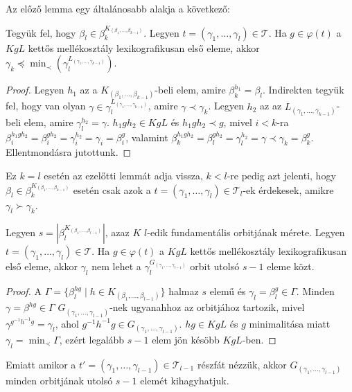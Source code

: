 Az előző lemma egy általánosabb alakja a következő:
\begin{lemma}
\label{thm:permbtcrit3}
Tegyük fel, hogy $\beta_l \in \beta_k^{K_{(\beta_1,\dots,\beta_{k-1})}}$.
Legyen $t = (\gamma_1, \dots, \gamma_l) \in \mathcal{T}$.
Ha $g \in \varphi(t)$ a $KgL$ kettős mellékosztály lexikografikusan első eleme, akkor $\gamma_k \preceq \min_{\prec}(\gamma_l^{L_{(\gamma_1,\dots,\gamma_{k-1})}})$.
\end{lemma}
\begin{proof}
Legyen $h_1$ az a $K_{(\beta_1,\dots,\beta_{k-1})}$-beli elem, amire $\beta_k^{h_1} = \beta_l$.
Indirekten tegyük fel, hogy van olyan $\gamma \in \gamma_l^{L_{(\gamma_1,\dots,\gamma_{k-1})}}$, amire $\gamma \prec \gamma_k$.
Legyen $h_2$ az az $L_{(\gamma_1,\dots,\gamma_{k-1})}$-beli elem, amire $\gamma_l^{h_2} = \gamma$.
$h_1gh_2 \in KgL$ és $h_1gh_2 \prec g$, mivel $i < k$-ra $\beta_i^{h_1gh_2} = \beta_i^{gh_2} = \gamma_i^{h_2} = \gamma_i = \beta_i^g$,
valamint $\beta_k^{h_1gh_2} = \beta_l^{gh_2} = \gamma_l^{h_2} = \gamma \prec \gamma_k = \beta_k^g$.
Ellentmondásra jutottunk.
\end{proof}
Ez $k=l$ esetén az ezelőtti lemmát adja vissza, $k < l$-re pedig azt jelenti, hogy $\beta_l \in \beta_k^{K_{(\beta_1,\dots,\beta_{k-1})}}$ esetén csak azok a $t = (\gamma_1, \dots, \gamma_l) \in \mathcal{T}_l$-ek
érdekesek, amikre $\gamma_l \succ \gamma_k$.

\begin{lemma}
\label{thm:permbtcrit4}
Legyen $s = \left| \beta_l^{K_{(\beta_1,\dots,\beta_{l-1})}} \right|$, azaz $K$ $l$-edik fundamentális orbitjának mérete.
Legyen $t = (\gamma_1, \dots, \gamma_l) \in \mathcal{T}$.
Ha $g \in \varphi(t)$ a $KgL$ kettős mellékosztály lexikografikusan első eleme, akkor $\gamma_l$ nem lehet a $\gamma_l^{G_{(\gamma_1,\dots,\gamma_{l-1})}}$ orbit utolsó $s-1$ eleme közt.
\end{lemma}
\begin{proof}
A $\Gamma = \{ \beta_l^{hg} \mid h \in K_{(\beta_1,\dots,\beta_{l-1})} \}$ halmaz $s$ elemű és $\gamma_l = \beta_l^g \in \Gamma$.
Minden $\gamma = \beta^{hg} \in \Gamma$ $G_{(\gamma_1,\dots,\gamma_{l-1})}$-nek ugyanahhoz az orbitjához tartozik, mivel $\gamma^{g^{-1}h^{-1}g} = \gamma_l$, ahol $g^{-1}h^{-1}g \in G_{(\gamma_1,\dots,\gamma_{l-1})}$.
$hg \in KgL$ és $g$ minimalitása miatt $\gamma_l = \min_{\prec} \Gamma$, ezért legalább $s-1$ elem jön késöbb $KgL$-ben.
\end{proof}
Emiatt amikor a $t' = (\gamma_1, \dots, \gamma_{l-1}) \in \mathcal{T}_{l-1}$ részfát nézzük, akkor $G_{(\gamma_1,\dots,\gamma_{l-1})}$ minden orbitjának utolsó $s-1$ elemét kihagyhatjuk.

